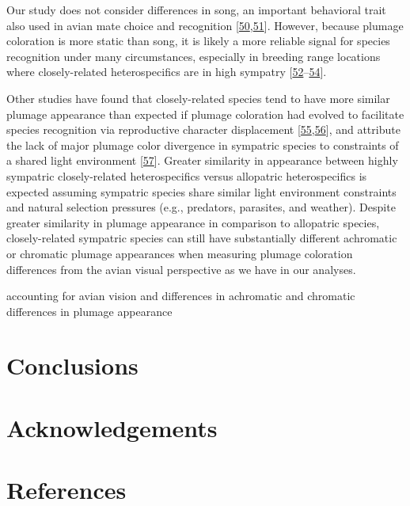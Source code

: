 \documentclass[
  a4paper,
]{article}
\begin{document}
Our study does not consider differences in song, an important behavioral
trait also used in avian mate choice and recognition
{[}\protect\hyperlink{ref-qvarnstrom2006}{50},\protect\hyperlink{ref-freeman2017}{51}{]}.
However, because plumage coloration is more static than song, it is
likely a more reliable signal for species recognition under many
circumstances, especially in breeding range locations where
closely-related heterospecifics are in high sympatry
{[}\protect\hyperlink{ref-emlen1975}{52}--\protect\hyperlink{ref-uy2009}{54}{]}.

Other studies have found that closely-related species tend to have more
similar plumage appearance than expected if plumage coloration had
evolved to facilitate species recognition via reproductive character
displacement
{[}\protect\hyperlink{ref-simpson2020}{55},\protect\hyperlink{ref-miller2019}{56}{]},
and attribute the lack of major plumage color divergence in sympatric
species to constraints of a shared light environment
{[}\protect\hyperlink{ref-mcnaught2002}{57}{]}. Greater similarity in
appearance between highly sympatric closely-related heterospecifics
versus allopatric heterospecifics is expected assuming sympatric species
share similar light environment constraints and natural selection
pressures (e.g., predators, parasites, and weather). Despite greater
similarity in plumage appearance in comparison to allopatric species,
closely-related sympatric species can still have substantially different
achromatic or chromatic plumage appearances when measuring plumage
coloration differences from the avian visual perspective as we have in
our analyses.

accounting for avian vision and differences in achromatic and chromatic
differences in plumage appearance

\hypertarget{conclusions}{%
\section{Conclusions}\label{conclusions}}

\hypertarget{acknowledgements}{%
\section{Acknowledgements}\label{acknowledgements}}

\hypertarget{references}{%
\section*{References}\label{references}}
\end{document}
